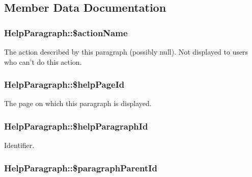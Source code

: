 \subsection{Member Data Documentation}
\hypertarget{classHelpParagraph_a0d0e5d452241543ab13527e21e1605c6}{
\subsubsection[{\$actionName}]{\setlength{\rightskip}{0pt plus 5cm}HelpParagraph::\$actionName}}
\label{classHelpParagraph_a0d0e5d452241543ab13527e21e1605c6}
The action described by this paragraph (possibly null). Not displayed to users who can't do this action. \hypertarget{classHelpParagraph_ac2f1ef24128c66ac5beca2e001d17e03}{
\subsubsection[{\$helpPageId}]{\setlength{\rightskip}{0pt plus 5cm}HelpParagraph::\$helpPageId}}
\label{classHelpParagraph_ac2f1ef24128c66ac5beca2e001d17e03}
The page on which this paragraph is displayed. \hypertarget{classHelpParagraph_a7ebe26d022e78fa7c5749935438cd39a}{
\subsubsection[{\$helpParagraphId}]{\setlength{\rightskip}{0pt plus 5cm}HelpParagraph::\$helpParagraphId}}
\label{classHelpParagraph_a7ebe26d022e78fa7c5749935438cd39a}
Identifier. \hypertarget{classHelpParagraph_a005ed945a6d04638d7a527a954460e97}{
\subsubsection[{\$paragraphParentId}]{\setlength{\rightskip}{0pt plus 5cm}HelpParagraph::\$paragraphParentId}}
